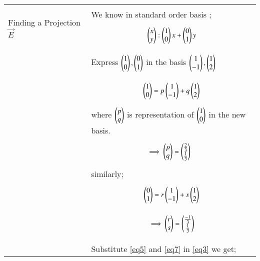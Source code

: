 \documentclass[journal,12pt]{IEEEtran}
\begin{document}
\begin{longtable}{|p{4cm}|p{14cm}|}
\hline
\multirow{3}{*}{Finding a Projection $\vec{E}$} & \\
       & We know in standard order basis ;\\
       & {\begin{align}\label{eq3}
       \begin{pmatrix}x\\y\end{pmatrix} : \begin{pmatrix}1\\0\end{pmatrix}x + \begin{pmatrix}0\\1\end{pmatrix}y
       \end{align}}\\
       &\\
       & Express $\begin{pmatrix}1\\0\end{pmatrix},\begin{pmatrix}0\\1\end{pmatrix}$ in the basis       $\begin{pmatrix}1\\-1\end{pmatrix},\begin{pmatrix}1\\2\end{pmatrix}$\\
      &\\
      & {\begin{align}\label{eq4}
      \begin{pmatrix}1\\0\end{pmatrix} = p\begin{pmatrix}1\\-1\end{pmatrix} + q\begin{pmatrix}1\\2\end{pmatrix}
      \end{align}}\\
      & where $\begin{pmatrix}p\\q\end{pmatrix}$ is representation of $\begin{pmatrix}1\\0\end{pmatrix}$ in  the new basis.\\
      &{\begin{align}\label{eq5}
      &\implies \begin{pmatrix}p\\q\end{pmatrix}=\begin{pmatrix}\frac{2}{3}\\\frac{1}{3}\end{pmatrix}
      &\end{align}}\\
      & similarly;\\
      & {\begin{align}\label{eq6} 
      \begin{pmatrix}0\\1\end{pmatrix}= r\begin{pmatrix}1\\-1\end{pmatrix} +s \begin{pmatrix}1\\2\end{pmatrix} 
      \end{align}}\\
      & {\begin{align}\label{eq7}
      \implies \begin{pmatrix}r\\s\end{pmatrix} = \begin{pmatrix}\frac{-1}{3}\\\frac{1}{3}\end{pmatrix}
      \end{align}}\\
      &\\
      & Substitute \eqref{eq5} and \eqref{eq7} in \eqref{eq3} we get;\\

\end{longtable}
\end{document}
